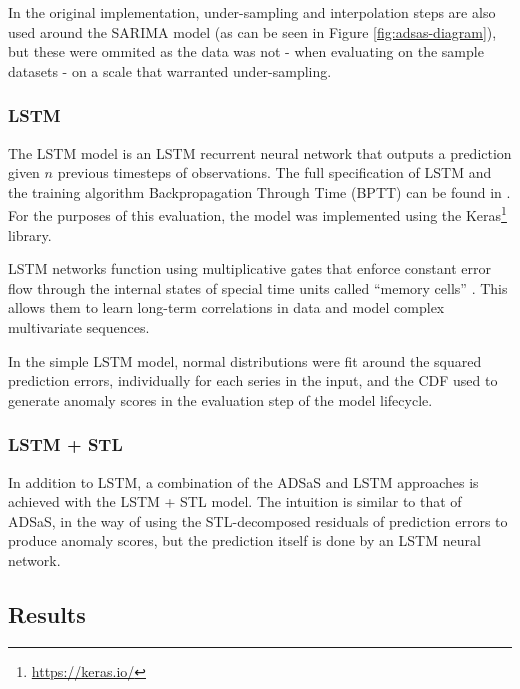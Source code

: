 \documentclass{mpaper}
\begin{document}
In the original implementation, under-sampling and interpolation steps are also used around the SARIMA model (as can be seen in Figure \ref{fig:adsas-diagram}), but these were ommited as the data was not - when evaluating on the sample datasets - on a scale that warranted under-sampling.


\subsubsection{LSTM}

The LSTM model is an LSTM recurrent neural network that outputs a prediction given $n$ previous timesteps of observations. The full specification of LSTM and the training algorithm Backpropagation Through Time (BPTT) can be found in \cite{LSTMHochreiter}. For the purposes of this evaluation, the model was implemented using the Keras\footnote{\url{https://keras.io/}} library.

LSTM networks function using multiplicative gates that enforce constant error flow through the internal states of special time units called ``memory cells'' \citep{lstmTimeSeriesAnomalyDetection}. This allows them to learn long-term correlations in data and model complex multivariate sequences.

In the simple LSTM model, normal distributions were fit around the squared prediction errors, individually for each series in the input, and the CDF used to generate anomaly scores in the evaluation step of the model lifecycle.

\subsubsection{LSTM + STL}

In addition to LSTM, a combination of the ADSaS and LSTM approaches is achieved with the LSTM + STL model. The intuition is similar to that of ADSaS, in the way of using the STL-decomposed residuals of prediction errors to produce anomaly scores, but the prediction itself is done by an LSTM neural network.

\subsection{Results}
\end{document}
